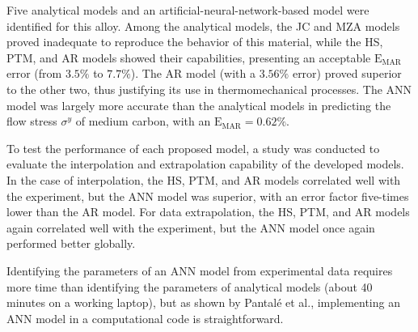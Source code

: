 \documentclass[metals,article,accept,pdftex,moreauthors]{Definitions/mdpi}
\makeatletter
\DeclareRobustCommand{\eal}{et al.\@\xspace}
\DeclareRobustCommand{\MARE}{\text{E}_\text{MAR}}
\makeatother
\begin{document}
Five analytical models and an artificial-neural-network-based model were identified for this alloy.
Among the analytical models, the JC and MZA models proved inadequate to reproduce the behavior of this material, while the HS, PTM, and AR models showed their capabilities, presenting an acceptable $\MARE$ error (from $3.5\%$ to $7.7\%$).
The AR model (with a $3.56\%$ error) proved superior to the other two, thus justifying its use in thermomechanical processes.
The ANN model was largely more accurate than the analytical models in predicting the flow stress $\sigma^y$ of medium carbon, with an $\MARE=0.62\%$.

To test the performance of each proposed model, a study was conducted to evaluate the interpolation and extrapolation capability of the developed models.
In the case of interpolation, the HS, PTM, and AR models correlated well with the experiment, but the ANN model was superior, with an error factor five-times lower than the AR model.
For data extrapolation, the HS, PTM, and AR models again correlated well with the experiment, but the ANN model once again performed better globally.

Identifying the parameters of an ANN model from experimental data requires more time than identifying the parameters of analytical models (about 40 minutes on a working laptop), but as shown by Pantalé \eal \cite{Pantale-2021, Pantale-2023}, implementing an ANN model in a computational code is straightforward.

\vspace{6pt}



\end{document}
